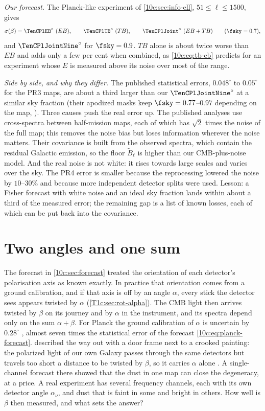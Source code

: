 \emph{Our forecast.} The Planck-like experiment of \cref{10c:sec:info-ell}, $51\le\ell\le1500$, gives
\begin{equation}
  \sigma(\beta)={\TenCPlEB}^\circ\ (EB),\qquad{\TenCPlTB}^\circ\ (TB),\qquad{\TenCPlJoint}^\circ\ (EB+TB)\qquad(\fsky=0.7),
  \label{10c:eq:planck-forecast}
\end{equation}
and ${\TenCPlJointNine}^\circ$ for $\fsky=0.9$. $TB$ alone is about twice worse than $EB$ and adds only a few per cent
when combined, as \eqref{10c:eq:tb-eb} predicts for an experiment whose $E$ is measured above its noise over most
of the range.

\emph{Side by side, and why they differ.} The published statistical errors, $0.048^\circ$ to $0.05^\circ$ for the PR3
maps, are about a third larger than our ${\TenCPlJointNine}^\circ$ at a similar sky fraction (their apodized masks keep
$\fsky=0.77$--$0.97$ depending on the map, \cite{MinamiKomatsu2020}). Three causes push the real error up. The
published analyses use cross-spectra between half-mission maps, each of which has $\sqrt2$ times the noise of the
full map; this removes the noise bias but loses information wherever the noise matters. Their covariance is built
from the observed spectra, which contain the residual Galactic emission, so the floor $\tilde B_\ell$ is higher than
our CMB-plus-noise model. And the real noise is not white: it rises towards large scales and varies over the sky.
The PR4 error is smaller because the reprocessing lowered the noise by $10$--$30\%$ \cite{DiegoPalazuelos2022} and
because more independent detector splits were used. Lesson: a Fisher forecast with white noise and an ideal sky
fraction lands within about a third of the measured error; the remaining gap is a list of known losses, each of
which can be put back into the covariance.
\section{Two angles and one sum}
\label{10c:sec:alpha-beta}

The forecast in \cref{10c:sec:forecast} treated the orientation of each
detector's polarisation axis as known exactly. In practice that orientation
comes from a ground calibration, and if that axis is off by an angle $\alpha$, every stick the detector sees appears twisted by $\alpha$
(\cref{T1c:sec:rot-alpha}). The CMB light then arrives twisted by $\beta$ on its journey and by $\alpha$ in the
instrument, and its spectra depend only on the sum $\alpha+\beta$. For Planck the ground calibration of $\alpha$ is
uncertain by $0.28^\circ$ \cite{MinamiKomatsu2020}, almost seven times the statistical error of the forecast
\eqref{10c:eq:planck-forecast}.  described the way out with a door frame next to a crooked
painting: the polarized light of our own Galaxy passes through the same detectors but travels too short a distance
to be twisted by $\beta$, so it carries $\alpha$ alone \cite{Minami2019}. A single-channel forecast there showed that
the dust in one map can close the degeneracy, at a price. A real experiment has several frequency channels, each
with its own detector angle $\alpha_\nu$, and dust that is faint in some and bright in others. How well is $\beta$
then measured, and what sets the answer?

